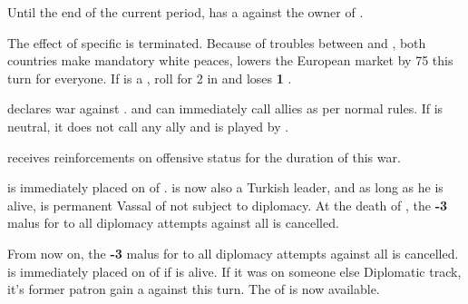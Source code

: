 \effetlong
\aparag Until the end of the current period, \FRA has a \CB against the owner
of \provinceLombardia.





\phevnt
\aparag The effect of specific  is
terminated.
\aparag Because of troubles between \paysDanemark and \paysSuede, both
countries make mandatory white peaces, lowers the European market by 75\ducats
this turn for everyone.
\aparag If \SUE is a \MAJ, roll for 2 \REVOLT in \SUE and \SUE loses {\bf 1}
\STAB.






\phevnt
\aparag \paysperse declares war against \TUR.
\aparag \paysperse and \TUR can immediately call allies as per normal rules.
\aparag If \paysperse is neutral, it does not call any ally and is played by
\SPA.

\phadm
\aparag \paysperse receives reinforcements on offensive status for the
duration of this war.






\phevnt
\aparag \paysAlgerie is immediately placed on \VASSAL of \TUR.
\aparag \leaderBarbaros is now also a Turkish leader, and as long as he is
alive, \paysAlgerie is permanent Vassal of \TUR not subject to diplomacy.
\aparag At the death of \leaderBarbaros, the {\bf -3} malus for \TUR to all
diplomacy attempts against all \Barbaresques is cancelled.





\phevnt
\aparag From now on, the {\bf -3} malus for \TUR to all diplomacy attempts
against all \Barbaresques is cancelled.
\aparag \paysTunisie is immediately placed on \VASSAL of \TUR if \leaderDragut
is alive.
\bparag If it was on someone else Diplomatic track, it's former patron gain a
\CB against \paysTunisie this turn.
\aparag The \corsaire of \paysMaroc is now available.



